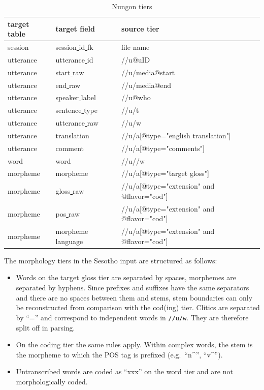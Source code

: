 \documentclass[a4paper, 11pt]{book}
\newcommand{\und}{\underline{{ }}\hspace{0.2mm}}	%
\begin{document}
\begin{table}[ht!]
	\centering
	\begin{tabular}{lll}
		\toprule
			\textbf{target table} & \textbf{target field} & \textbf{source tier} \\
		\midrule
			session 	& session\und id\und fk 	& file name \\
			utterance 	& utterance\und id			& //u@uID \\
			utterance 	& start\und raw				& //u/media@start \\
			utterance 	& end\und raw				& //u/media@end \\
			utterance 	& speaker\und label			& //u@who \\
			utterance 	& sentence\und type			& //u/t \\
			utterance 	& utterance\und raw			& //u/w \\ 
			utterance 	& translation				& //u/a[@type="english translation"] \\
			utterance 	& comment					& //u/a[@type="comments"] \\
			word	 	& word						& //u//w \\
			morpheme	& morpheme					& //u/a[@type="target gloss"] \\
			morpheme	& gloss\und raw				& //u/a[@type="extension" and @flavor="cod"] \\
			morpheme	& pos\und raw				& //u/a[@type="extension" and @flavor="cod"] \\
			morpheme	& morpheme\und language		& //u/a[@type="extension" and @flavor="cod"] \\
		\bottomrule
	\end{tabular}
	\caption{Nungon tiers}
	\label{tab:Nungon tiers}
\end{table}

The morphology tiers in the Sesotho input are structured as follows: 

\begin{itemize}
	\item Words on the target gloss tier are separated by spaces, morphemes are separated by hyphens. Since prefixes and suffixes have the same separators
		and there are no spaces between them and stems, stem boundaries can only be reconstructed from comparison with the cod(ing) tier. 
		Clitics are separated by “=” and correspond to independent words in \texttt{//u/w}. They are therefore split off in parsing. 
	\item On the coding tier the same rules apply. Within complex words, the stem is the morpheme to which the POS tag is prefixed 
		(e.g.\ “n\^{}”, “v\^{}”). 
	\item Untranscribed words are coded as “xxx” on the word tier and are not morphologically coded. 
\end{itemize}
\end{document}
